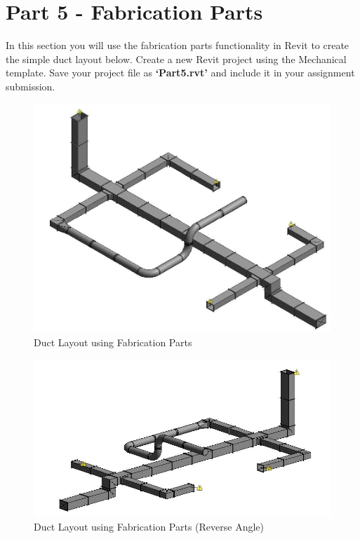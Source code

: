 \newpage

\section*{Part 5 - Fabrication Parts}
In this section you will use the fabrication parts functionality in Revit to create the simple duct layout below. Create a new Revit project using the Mechanical template. Save your project file as \textbf{‘Part5.rvt’} and include it in your assignment submission.

\begin{figure}[h]
	\centering
	\includegraphics[width=0.7\linewidth]{img/FabParts.jpg}
	\caption{Duct Layout using Fabrication Parts}
	\label{fig:FabParts}
\end{figure}


\begin{figure}[h]
	\centering
	\includegraphics[width=0.7\linewidth]{img/FabPartsReverse.jpg}
	\caption{Duct Layout using Fabrication Parts (Reverse Angle)}
	\label{fig:FabPartsReverse}
\end{figure}


